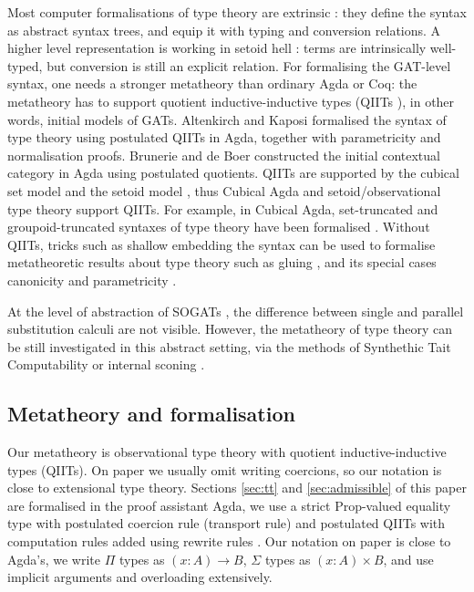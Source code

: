 \documentclass[sigplan,10pt,anonymous,review]{acmart}\settopmatter{printfolios=true,printccs=false,printacmref=false}
\newcommand{\ra}{\rightarrow}
\begin{document}
Most computer formalisations of type theory are extrinsic
\cite{DBLP:journals/pacmpl/0001OV18,DBLP:conf/cpp/AdjedjLMPP24,DBLP:journals/jar/SozeauABCFKMTW20}:
they define the syntax as abstract syntax trees, and equip it with
typing and conversion relations. A higher level representation is
working in setoid hell \cite{chapman09eatitself}: terms are
intrinsically well-typed, but conversion is still an explicit
relation. For formalising the GAT-level syntax, one needs a stronger
metatheory than ordinary Agda or Coq: the metatheory has to support
quotient inductive-inductive types (QIITs
\cite{DBLP:journals/pacmpl/KaposiKA19}), in other words, initial
models of GATs. Altenkirch and Kaposi
\cite{DBLP:conf/popl/AltenkirchK16} formalised the syntax of type
theory using postulated QIITs in Agda, together with parametricity and
normalisation \cite{lmcs:4005} proofs. Brunerie and de Boer
\cite{initiality-agda} constructed the initial contextual category in
Agda using postulated quotients. QIITs are supported by the cubical
set model \cite{DBLP:conf/lics/CoquandHM18} and the setoid model
\cite{kaposi-qiit-setoid}, thus Cubical Agda
\cite{DBLP:journals/jfp/VezzosiMA21} and setoid/observational type
theory \cite{setoid,DBLP:phd/hal/Pujet22} support QIITs. For example,
in Cubical Agda, set-truncated and groupoid-truncated syntaxes of type
theory have been formalised \cite{cohtt}. Without QIITs, tricks such
as shallow embedding the syntax can be used to formalise metatheoretic
results about type theory such as gluing
\cite{kaposi_et_al:LIPIcs:2019:10532}, and its special cases
canonicity and parametricity \cite{kaposi-shallow}.

At the level of abstraction of SOGATs
\cite{uemura,DBLP:conf/fscd/KaposiX24}, the difference between single
and parallel substitution calculi are not visible. However, the
metatheory of type theory can be still investigated in this abstract
setting, via the methods of Synthethic Tait Computability
\cite{DBLP:phd/us/Sterling22} or internal sconing
\cite{DBLP:conf/fscd/BocquetKS23}.


\subsection{Metatheory and formalisation}

Our metatheory is observational type theory
\cite{DBLP:phd/hal/Pujet22} with quotient inductive-inductive types
(QIITs). On paper we usually omit writing coercions, so our notation
is close to extensional type theory. Sections \ref{sec:tt} and
\ref{sec:admissible} of this paper are formalised in the proof
assistant Agda, we use a strict Prop-valued
\cite{DBLP:journals/pacmpl/GilbertCST19} equality type with postulated
coercion rule (transport rule) and postulated QIITs with computation
rules added using rewrite rules
\cite{DBLP:journals/pacmpl/CockxTW21}. Our notation on paper is close
to Agda's, we write $\Pi$ types as $(x:A)\ra B$, $\Sigma$ types as
$(x:A)\times B$, and use implicit arguments and overloading
extensively.
\end{document}
